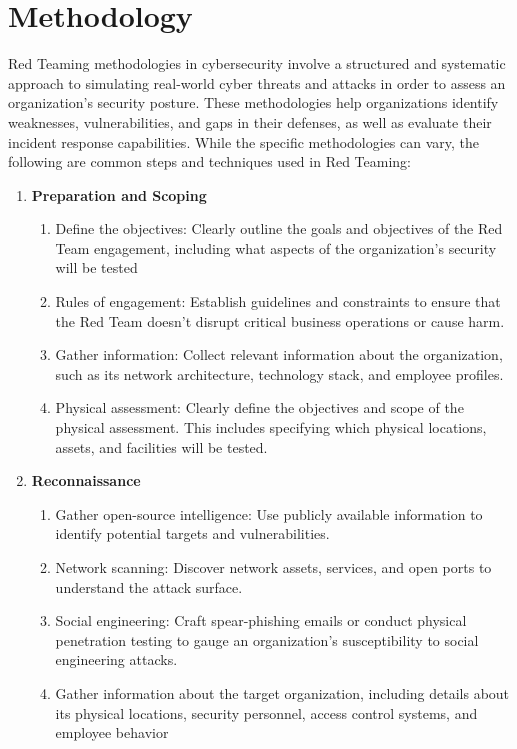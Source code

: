 \section{Methodology}
Red Teaming methodologies in cybersecurity involve a structured and systematic approach to simulating real-world cyber threats and attacks in order to assess an organization's security posture. These methodologies help organizations identify weaknesses, vulnerabilities, and gaps in their defenses, as well as evaluate their incident response capabilities. While the specific methodologies can vary, the following are common steps and techniques used in Red Teaming:
\begin{enumerate}

\item \textbf{Preparation and Scoping}
\begin{enumerate}
\item Define the objectives: Clearly outline the goals and objectives of the Red Team engagement, including what aspects of the organization's security will be tested
\item Rules of engagement: Establish guidelines and constraints to ensure that the Red Team doesn't disrupt critical business operations or cause harm.
\item Gather information: Collect relevant information about the organization, such as its network architecture, technology stack, and employee profiles.
\item Physical assessment: Clearly define the objectives and scope of the physical assessment. This includes specifying which physical locations, assets, and facilities will be tested.
\end{enumerate}

\item \textbf{Reconnaissance}

\begin{enumerate}
\item Gather open-source intelligence: Use publicly available information to identify potential targets and vulnerabilities.
\item Network scanning: Discover network assets, services, and open ports to understand the attack surface.
\item Social engineering: Craft spear-phishing emails or conduct physical penetration testing to gauge an organization's susceptibility to social engineering attacks.
\item Gather information about the target organization, including details about its physical locations, security personnel, access control systems, and employee behavior
\end{enumerate}


\end{enumerate}
